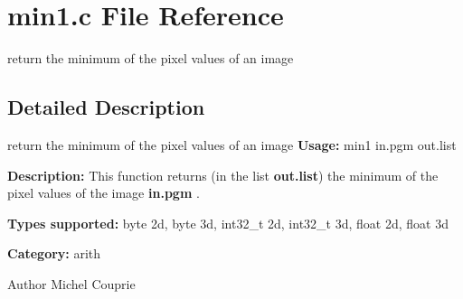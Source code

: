 \section{min1.c File Reference}
\label{min1_8c}


return the minimum of the pixel values of an image  




\subsection{Detailed Description}
return the minimum of the pixel values of an image {\bfseries Usage:} min1 in.pgm out.list

{\bfseries Description:} This function returns (in the list {\bfseries out.list}) the minimum of the pixel values of the image {\bfseries in.pgm} .

{\bfseries Types supported:} byte 2d, byte 3d, int32\_\-t 2d, int32\_\-t 3d, float 2d, float 3d

{\bfseries Category:} arith

\begin{DoxyAuthor}{Author}
Michel Couprie 
\end{DoxyAuthor}

